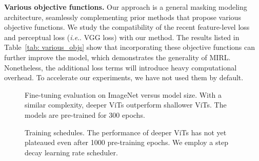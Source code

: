 \documentclass{article}
\makeatletter
\DeclareRobustCommand\onedot{\futurelet\@let@token\@onedot}
\def\@onedot{\ifx\@let@token.\else.\null\fi\xspace}
\def\ie{\emph{i.e}\onedot} \def\Ie{\emph{I.e}\onedot}
\makeatother
\begin{document}
\textbf{Various objective functions.} 
Our approach is a general masking modeling architecture, seamlessly complementing prior methods that propose various objective functions.
We study the compatibility of the recent feature-level loss and perceptual loss (\ie VGG loss) with our method. The results listed in Table~\ref{tab: various_objs} show that incorporating these objective functions can further improve the model, which demonstrates the generality of MIRL.
Nonetheless, the additional loss terms will introduce heavy computational overhead. To accelerate our experiments, we have not used them by default. 


\begin{figure}[!t]
\flushleft 
  \begin{floatrow}
    {\vspace{0pt}\caption{\label{fig: vit_instances} Fine-tuning evaluation on ImageNet versus model size. With a similar complexity, deeper ViTs outperform shallower ViTs. The models are pre-trained for 300 epochs.
}}
    {\vspace{0pt}\caption{\label{fig: train_time} Training schedules. The performance of deeper ViTs has not yet plateaued even after 1000 pre-training epochs. We employ a step decay learning rate scheduler.}}
  \end{floatrow}
\end{figure}
\end{document}
